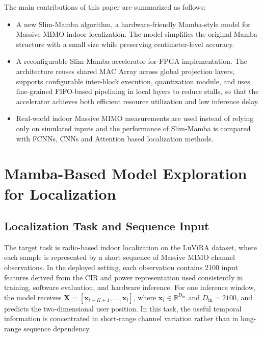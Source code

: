 \documentclass[lettersize,journal]{IEEEtran}
\begin{document}
The main contributions of this paper are summarized as follows:

\begin{itemize}
    \item A new Slim-Mamba algorithm, a hardware-friendly Mamba-style model for
    Massive MIMO indoor localization. The model simplifies the original 
    Mamba structure with a small size while preserving centimeter-level accuracy.

    \item A reconfigurable Slim-Mamba accelerator for FPGA
    implementation. The architecture reuses shared MAC Array across global
    projection layers, supports configurable inter-block execution, quantization module, 
    and uses fine-grained FIFO-based pipelining in local layers to reduce stalls, so that the 
    accelerator achieves both efficient resource utilization and low inference delay.

    \item Real-world
    indoor Massive MIMO measurements are used  instead of relying only on simulated inputs and the performance of Slim-Mamba is compared with FCNNs, CNNs and Attention based localization methods. 
    
\end{itemize}

\section{Mamba-Based Model Exploration for Localization}
\label{sec:algorithm}

\subsection{Localization Task and Sequence Input}

The target task is radio-based indoor localization on the LuViRA dataset, where
each sample is represented by a short sequence of Massive MIMO channel
observations. In the deployed setting, each observation contains 2100 input
features derived from the CIR and power representation used consistently in
training, software evaluation, and hardware inference. For one inference window,
the model receives
\(\mathbf{X}=[\mathbf{x}_{t-K+1},\ldots,\mathbf{x}_t]\), where
\(\mathbf{x}_i \in \mathbb{R}^{D_{\mathrm{in}}}\) and
\(D_{\mathrm{in}}=2100\), and predicts the two-dimensional user position. In
this task, the useful temporal information is concentrated in short-range
channel variation rather than in long-range sequence dependency.
\end{document}

